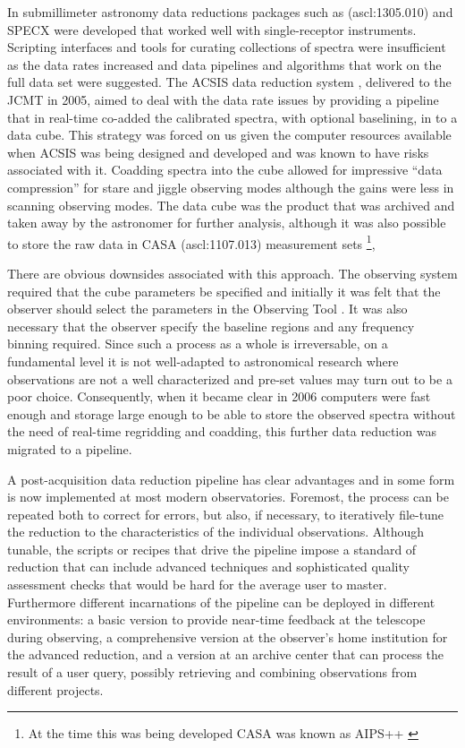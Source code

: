 \documentclass[final,authoryear,5p,times,twocolumn]{elsarticle}
\begin{document}
In submillimeter astronomy data reductions packages such as
(ascl:1305.010) and
SPECX \citep{SPECX} were developed that worked well with
single-receptor instruments. Scripting interfaces and tools for
curating collections of spectra were insufficient as the data rates
increased and data pipelines \citep[e.g.,][]{1995ASPC...75..117W} and
algorithms that work on the full data set
\citep[e.g.,][]{2002ASPC..278..329M} were suggested. The ACSIS data
reduction system \citep{2000ASPC..216..502L,2000SPIE.4015..114H},
delivered to the JCMT in 2005, aimed to deal with the data rate issues
by providing a pipeline that in real-time co-added the calibrated
spectra, with optional baselining, in to a data cube.  This strategy
was forced on us given the computer resources available when ACSIS was
being designed and developed and was known to have risks associated
with it. Coadding spectra into the cube allowed for impressive ``data
compression'' for stare and jiggle observing modes although the gains
were less in scanning observing modes.
The data cube was the product that was archived and taken away by the
astronomer for further analysis, although it was also possible to
store the raw data in CASA (ascl:1107.013) measurement sets
\citep{2012ASPC..461..849P}\footnote{At the time this was being
  developed CASA was known as AIPS++ \citep{2004ASPC..314..468M}},

There are obvious downsides associated with this approach. The
observing system required that the cube parameters be specified and
initially it was felt that the observer should select the parameters
in the Observing Tool \citep{2002ASPC..281..453F}. It was also
necessary that the observer specify the baseline regions and any
frequency binning required. Since such a process as a whole is
irreversable, on a fundamental level it is not well-adapted to
astronomical research where observations are not a well characterized
and pre-set values may turn out to be a poor choice.  Consequently,
when it became clear in 2006 computers were fast enough and storage
large enough to be able to store the observed spectra without the need
of real-time regridding and coadding, this further data reduction was
migrated to a pipeline.

A post-acquisition data reduction pipeline has clear advantages and in
some form is now implemented at most modern observatories. Foremost,
the process can be repeated both to correct for errors, but also, if
necessary, to iteratively file-tune the reduction to the
characteristics of the individual observations. Although tunable, the
scripts or recipes that drive the pipeline impose a standard of
reduction that can include advanced techniques and sophisticated
quality assessment checks that would be hard for the average user to
master. Furthermore different incarnations of the pipeline can be
deployed in different environments: a basic version to provide
near-time feedback at the telescope during observing, a comprehensive
version at the observer's home institution for the advanced reduction,
and a version at an archive center that can process the result of a
user query, possibly retrieving and combining observations from
different projects.
\end{document}
